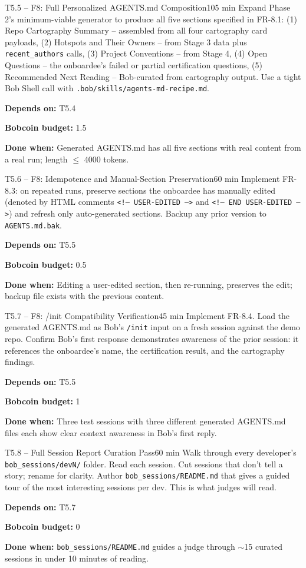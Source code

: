 \documentclass[11pt,letterpaper]{article}
\newcommand{\acceptance}[1]{\par\smallskip\textcolor{ibmgreen}{\textbf{Done when:}} #1}
\newcommand{\depends}[1]{\par\smallskip\textcolor{ibmorange}{\textbf{Depends on:}} #1}
\newcommand{\bobcost}[1]{\par\smallskip\textcolor{ibmaccent}{\textbf{Bobcoin budget:}} #1}
\begin{document}
\begin{task}{T5.5 -- F8: Full Personalized AGENTS.md Composition}{105 min}
Expand Phase 2's minimum-viable generator to produce all five sections specified in FR-8.1: (1) Repo Cartography Summary -- assembled from all four cartography card payloads, (2) Hotspots and Their Owners -- from Stage 3 data plus \texttt{recent\_authors} calls, (3) Project Conventions -- from Stage 4, (4) Open Questions -- the onboardee's failed or partial certification questions, (5) Recommended Next Reading -- Bob-curated from cartography output. Use a tight Bob Shell call with \texttt{.bob/skills/agents-md-recipe.md}.
\depends{T5.4}
\bobcost{1.5}
\acceptance{Generated AGENTS.md has all five sections with real content from a real run; length $\leq$ 4000 tokens.}
\end{task}

\begin{task}{T5.6 -- F8: Idempotence and Manual-Section Preservation}{60 min}
Implement FR-8.3: on repeated runs, preserve sections the onboardee has manually edited (denoted by HTML comments \texttt{<!-- USER-EDITED -->} and \texttt{<!-- END USER-EDITED -->}) and refresh only auto-generated sections. Backup any prior version to \texttt{AGENTS.md.bak}.
\depends{T5.5}
\bobcost{0.5}
\acceptance{Editing a user-edited section, then re-running, preserves the edit; backup file exists with the previous content.}
\end{task}

\begin{task}{T5.7 -- F8: /init Compatibility Verification}{45 min}
Implement FR-8.4. Load the generated AGENTS.md as Bob's \texttt{/init} input on a fresh session against the demo repo. Confirm Bob's first response demonstrates awareness of the prior session: it references the onboardee's name, the certification result, and the cartography findings.
\depends{T5.5}
\bobcost{1}
\acceptance{Three test sessions with three different generated AGENTS.md files each show clear context awareness in Bob's first reply.}
\end{task}

\begin{task}{T5.8 -- Full Session Report Curation Pass}{60 min}
Walk through every developer's \texttt{bob\_sessions/devN/} folder. Read each session. Cut sessions that don't tell a story; rename for clarity. Author \texttt{bob\_sessions/README.md} that gives a guided tour of the most interesting sessions per dev. This is what judges will read.
\depends{T5.7}
\bobcost{0}
\acceptance{\texttt{bob\_sessions/README.md} guides a judge through ${\sim}$15 curated sessions in under 10 minutes of reading.}
\end{task}
\end{document}
